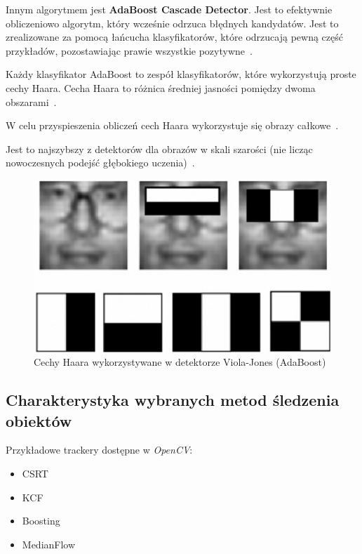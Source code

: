 \documentclass[wi]{zut}
\begin{document}
Innym algorytmem jest \textbf{AdaBoost Cascade Detector}. Jest to efektywnie obliczeniowo algorytm, który wcześnie odrzuca błędnych kandydatów. Jest to zrealizowane za pomocą łańcucha klasyfikatorów, które odrzucają pewną część przykładów, pozostawiając prawie wszystkie pozytywne~\cite{ForczmanskiCV}.

Każdy klasyfikator AdaBoost to zespół klasyfikatorów, które wykorzystują proste cechy Haara. Cecha Haara to różnica średniej jasności pomiędzy dwoma obszarami~\cite{ForczmanskiCV}.

W celu przyspieszenia obliczeń cech Haara wykorzystuje się obrazy całkowe~\cite{ForczmanskiCV}. 

Jest to najszybszy z detektorów dla obrazów w skali szarości (nie licząc nowoczesnych podejść głębokiego uczenia)~\cite{ForczmanskiCV}.

\begin{figure}[H]
    \centering
    \includegraphics[width=0.5\linewidth]{images/Haar-features-used-for-Viola-Jones-face-detection-method.png}
    \caption{Cechy Haara wykorzystywane w detektorze Viola-Jones (AdaBoost)}
    \label{fig:pdgd}
\end{figure}

\subsection{Charakterystyka wybranych metod śledzenia obiektów}

Przykładowe trackery dostępne w \textit{OpenCV}:

\begin{itemize}
    \item CSRT
    \item KCF
    \item Boosting
    \item MedianFlow
\end{itemize}
\end{document}
